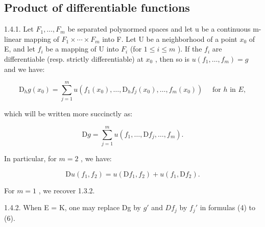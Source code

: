 \subsection{Product of differentiable functions}

1.4.1. Let \(F_{1}, \ldots, F_{m}\) be separated polynormed spaces and let u be a continuous m-linear mapping of \(F_{1} \times \cdots \times F_{m}\) into F. Let U be a neighborhood of a point \(x_{0}\) of E, and let \(f_{i}\) be a mapping of U into \(F_{i}\) (for \(1 \leqslant i \leqslant m\) ). If the \(f_{i}\) are differentiable (resp. strictly differentiable) at \(x_{0}\) , then so is \(u(f_{1}, \ldots, f_{m}) = g\) and we have:

\[
\mathrm{D} _ {h} g (x _ {0}) = \sum_ {j = 1} ^ {m} u (f _ {1} (x _ {0}), \dots , \mathrm{D} _ {h} f _ {j} (x _ {0}), \dots , f _ {m} (x _ {0})) \quad \text { for } h \text { in } E, \tag {4}
\]

which will be written more succinctly as:

\[
\mathrm{D} g = \sum_ {j = 1} ^ {m} u (f _ {1}, \dots , \mathrm{D} f _ {j}, \dots , f _ {m}).\tag{5}
\]

In particular, for \(m = 2\) , we have:

\[
\mathrm{D} u (f _ {1}, f _ {2}) = u (\mathrm{D} f _ {1}, f _ {2}) + u (f _ {1}, \mathrm{D} f _ {2}).\tag{6}
\]

For \(m = 1\) , we recover 1.3.2.

1.4.2. When E = K, one may replace Dg by \(g'\) and \(Df_{j}\) by \(f_{j}'\) in formulas (4) to (6).

